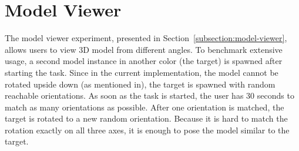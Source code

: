 \section{Model Viewer}\label{section:eval-mv}

The model viewer experiment, presented in Section~\ref{subsection:model-viewer}, allows users to view \ac{3D} model from different angles. To benchmark extensive usage, a second model instance in another color (the target) is spawned after starting the task. Since in the current implementation, the model cannot be rotated upside down (as mentioned in), the target is spawned with random reachable orientations.
As soon as the task is started, the user has 30 seconds to match as many orientations as possible. After one orientation is matched, the target is rotated to a new random orientation.
Because it is hard to match the rotation exactly on all three axes, it is enough to pose the model similar to the target.
